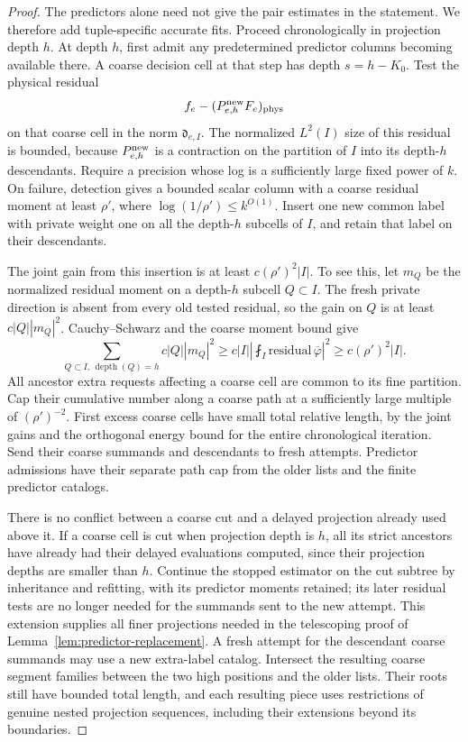 \begin{proof}
The predictors alone need not give the pair estimates in the
statement.  We therefore add tuple-specific accurate fits.
Proceed chronologically in projection depth $h$.  At depth
$h$, first admit any predetermined predictor columns becoming
available there.  A coarse decision cell at that step has
depth $s=h-K_0$.  Test the physical residual
\[
 f_e-(P^{\rm new}_{e,h}F_e)_{\mathrm{phys}}
\]
on that coarse cell in the norm $\mathfrak d_{e,I}$.
The normalized $L^2(I)$ size of this residual is bounded,
because $P^{\rm new}_{e,h}$ is a contraction on the partition
of $I$ into its depth-$h$ descendants.  Require a precision
whose log is a sufficiently large fixed power of $k$.
On failure, detection gives a bounded scalar column with a
coarse residual moment at least $\rho'$, where
$\log(1/\rho')\le k^{O(1)}$.  Insert one new common label
with private weight one on all the depth-$h$ subcells of
$I$, and retain that label on their descendants.

The joint gain from this insertion is at least
$c(\rho')^2|I|$.  To see this, let $m_Q$ be the normalized
residual moment on a depth-$h$ subcell $Q\subset I$.
The fresh private direction is absent from every old tested
residual, so the gain on $Q$ is at least $c|Q||m_Q|^2$.
Cauchy--Schwarz and the coarse moment bound give
\[
 \sum_{Q\subset I,\,\operatorname{depth}(Q)=h}
                  c|Q||m_Q|^2
 \ge c|I|\left|\fint_I\text{residual}\,\overline{\varphi}\right|^2
 \ge c(\rho')^2|I|.
\]
All ancestor extra requests affecting a coarse cell are common
to its fine partition.  Cap their cumulative number along a
coarse path at a sufficiently large multiple of
$(\rho')^{-2}$.  First excess coarse cells have small total
relative length, by the joint gains and the orthogonal energy
bound for the entire chronological iteration.  Send their
coarse summands and descendants to fresh attempts.  Predictor
admissions have their separate path cap from the older lists
and the finite predictor catalogs.

There is no conflict between a coarse cut and a delayed
projection already used above it.  If a coarse cell is cut
when projection depth is $h$, all its strict ancestors have
already had their delayed evaluations computed, since their
projection depths are smaller than $h$.  Continue the stopped
estimator on the cut subtree by inheritance and refitting,
with its predictor moments retained; its later residual tests
are no longer needed for the summands sent to the new
attempt.  This extension supplies all finer projections
needed in the telescoping proof of
Lemma~\ref{lem:predictor-replacement}.  A fresh attempt for
the descendant coarse summands may use a new extra-label
catalog.  Intersect the resulting coarse segment families
between the two high positions and the older lists.
Their roots still have bounded total length, and each
resulting piece uses restrictions of genuine nested
projection sequences, including their extensions beyond
its boundaries.


\end{proof}
